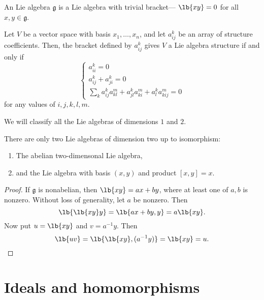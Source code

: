 \documentclass{article}
\DeclarePairedDelimiter\lb\lbrack\rbrack
\newcommand*\frkg{{\ensuremath{\mathfrak{g}}}}
\begin{document}
\begin{definition}
    An  Lie algebra $\frkg$ is a Lie algebra with trivial bracket--- $\lb{xy} = 0$ for all $x,y \in \frkg$.
\end{definition}

\begin{proposition}
    Let $V$ be a vector space with basis $x_1,\ldots,x_n$, and let $a_{ij}^k$ be an array of structure coefficients.
    Then, the bracket defined by $a_{ij}^k$ gives $V$ a Lie algebra structure if and only if
    \[
        \begin{cases}
            a_{ii}^k = 0 \\
            a_{ij}^k + a_{ji}^k = 0 \\
            \sum_k
            a_{ij}^ka_{kl}^m
            + a_{jl}^ka_{ki}^m
            + a_{l}^ka_{kij}^m
            =
            0
        \end{cases}
    \]
    for any values of $i,j,k,l,m$.
\end{proposition}

We will classify all the Lie algebras of dimensions $1$ and $2$.

\begin{proposition}
    There are only two Lie algebras of dimension two up to isomorphism:
    \begin{enumerate}[label=(\alph*)]
        \item 
            The abelian two-dimensonal Lie algebra,
        \item 
            and the Lie algebra with basis $(x,y)$ and product $[x,y] = x$.
    \end{enumerate}
\end{proposition}

\begin{proof}
    If $\frkg$ is nonabelian, then $\lb{xy} = ax + by$, where at least one of $a, b$ is nonzero.
    Without loss of generality, let $a$ be nonzero.
    Then
    \[
        \lb{\lb{xy}y}
        =
        \lb{ax + by,y}
        =
        a\lb{xy}.
    \]
    Now put $u = \lb{xy}$ and $v = a^{-1}y$.
    Then
    \[
        \lb{uv}
        =
        \lb{\lb{xy},(a^{-1}y)}
        =
        \lb{xy}
        =
        u.
    \]
\end{proof}

\section{Ideals and homomorphisms}
\end{document}
